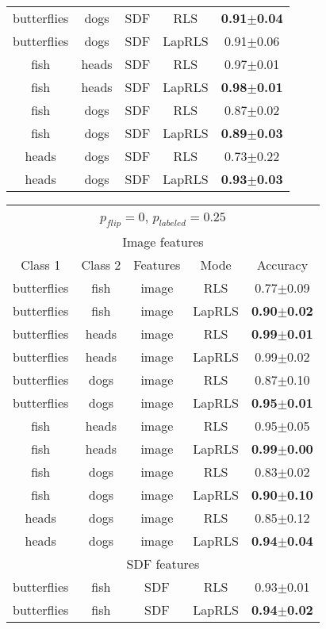 \documentclass[anon,11pt]{9520} %
\begin{document}
\begin{table}[h!]
\begin{center}
\begin{tabular}{|c|c|c|c|c|}
butterflies&	dogs&	SDF&	RLS&	\textbf{0.91$\pm$0.04}\\
butterflies&	dogs&	SDF&	LapRLS&	0.91$\pm$0.06\\\hline

fish&	heads&	SDF&	RLS&	0.97$\pm$0.01\\
fish&	heads&	SDF&	LapRLS&	\textbf{0.98$\pm$0.01}\\\hline

fish&	dogs&	SDF&	RLS&	0.87$\pm$0.02\\
fish&	dogs&	SDF&	LapRLS&	\textbf{0.89$\pm$0.03}\\\hline

heads&	dogs&	SDF&	RLS&	0.73$\pm$0.22\\
heads&	dogs&	SDF&	LapRLS&	\textbf{0.93$\pm$0.03}\\\hline
\end{tabular}
\begin{tabular}{|c|c|c|c|c|}
\multicolumn{5}{c}{$p_{flip} = 0$, $p_{labeled} = 0.25$}\\
\multicolumn{5}{c}{Image features}\\
\hline
Class 1 & Class 2 & Features & Mode & Accuracy\\\hline

butterflies&	fish&	image&	RLS&	0.77$\pm$0.09\\
butterflies&	fish&	image&	LapRLS&	\textbf{0.90$\pm$0.02}\\\hline

butterflies&	heads&	image&		RLS&	\textbf{0.99$\pm$0.01}\\
butterflies&	heads&	image&		LapRLS&	0.99$\pm$0.02\\\hline

butterflies&	dogs&	image&		RLS&	0.87$\pm$0.10\\
butterflies&	dogs&	image&		LapRLS&	\textbf{0.95$\pm$0.01}\\\hline

fish&	heads&	image&		RLS&			0.95$\pm$0.05\\
fish&	heads&	image&		LapRLS&			\textbf{0.99$\pm$0.00}\\\hline

fish&	dogs&	image&		RLS&			0.83$\pm$0.02\\
fish&	dogs&	image&		LapRLS&			\textbf{0.90$\pm$0.10}\\\hline

heads&	dogs&	image&		RLS&			0.85$\pm$0.12\\
heads&	dogs&	image&		LapRLS&			\textbf{0.94$\pm$0.04}\\\hline
\multicolumn{5}{c}{SDF features}\\\hline
butterflies&	fish&	SDF&		RLS&			0.93$\pm$0.01\\
butterflies&	fish&	SDF&		LapRLS&			\textbf{0.94$\pm$0.02}\\\hline


\end{tabular}
\end{center}
\end{table}
\end{document}
